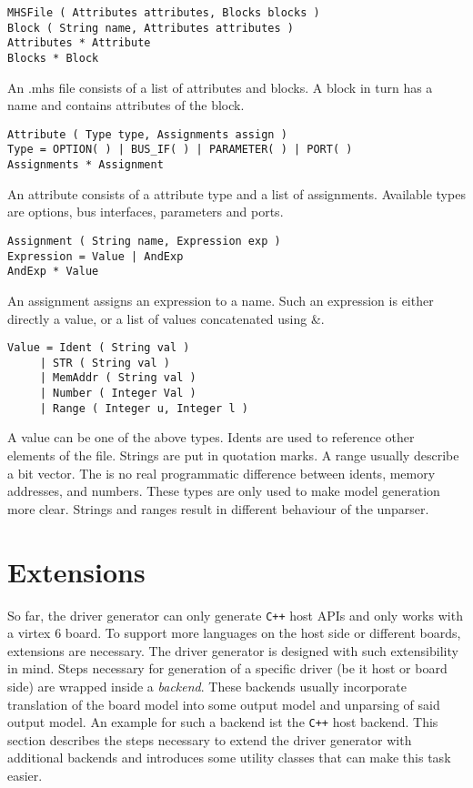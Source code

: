 \documentclass{report}
\begin{document}
\begin{lstlisting}
MHSFile ( Attributes attributes, Blocks blocks )
Block ( String name, Attributes attributes )
Attributes * Attribute
Blocks * Block
\end{lstlisting}

An .mhs file consists of a list of attributes and blocks. A block in turn has a name and contains attributes of the block.

\begin{lstlisting}
Attribute ( Type type, Assignments assign )
Type = OPTION( ) | BUS_IF( ) | PARAMETER( ) | PORT( )
Assignments * Assignment
\end{lstlisting}

An attribute consists of a attribute type and a list of assignments. Available types are options, bus interfaces, parameters and ports.

\begin{lstlisting}
Assignment ( String name, Expression exp )
Expression = Value | AndExp
AndExp * Value
\end{lstlisting}

An assignment assigns an expression to a name. Such an expression is either directly a value, or a list of values concatenated using \&. %

\begin{lstlisting}
Value = Ident ( String val )
     | STR ( String val )
     | MemAddr ( String val )
     | Number ( Integer Val )
     | Range ( Integer u, Integer l )
\end{lstlisting}

A value can be one of the above types. Idents are used to reference other elements of the file. Strings are put in quotation marks. A range usually describe a bit vector.
The is no real programmatic difference between idents, memory addresses, and numbers. These types are only used to make model generation more clear. Strings and ranges result in different behaviour of the unparser.

\section{Extensions}
So far, the driver generator can only generate \texttt{C++} host APIs and only works with a virtex 6 board. To support more languages on the host side or different boards, extensions are necessary. The driver generator is designed with such extensibility in mind. Steps necessary for generation of a specific driver (be it host or board side) are wrapped inside a \textit{backend}. These backends usually incorporate translation of the board model into some output model and unparsing of said output model. An example for such a backend ist the \texttt{C++} host backend. This section describes the steps necessary to extend the driver generator with additional backends and introduces some utility classes that can make this task easier. 
\end{document}
